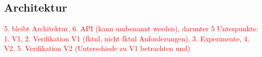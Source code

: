 \subsection{Architektur} \label{sec:Architektur}
    
    
    \textcolor{red}{
        5. bleibt Architektur, 6. \ac{API} (kann umbenannt werden), darunter 5 Unterpunkte: 1. V1, 2. Verifikation V1 (fktnl, nicht fktnl Anforderungen), 3. Experimente, 4. V2, 5. Verifikation V2 (Unterschiede zu V1 betrachten und)
    }
